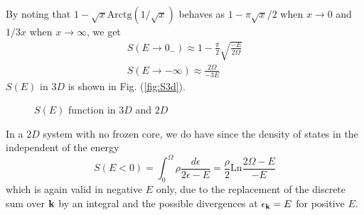 \documentclass[11pt]{article} %
\begin{document}
By noting that $1-\sqrt{x}\text{Arctg}(1/\sqrt{x})$ behaves as $1-\pi\sqrt{x}/2$ when $x\to0$ and $1/3x$ when $x\to\infty$, we get 
\begin{gather}
S(E\to0_{-})\approx1-\frac{\pi}{2}\sqrt{\frac{-E}{2\Omega}}\\
S(E\to-\infty)\approx\frac{2\Omega}{-3E}
\end{gather}
$S(E)$ in $3D$ is shown in Fig. (\ref{fig:S3d}).
\begin{figure}[hhtb]
	\centering
	         \qquad
		\caption{$S(E)$ function in $3D$ and $2D$\label{fig:narrowFR}}
\end{figure}
In a $2D$ system with no frozen core, we do have since the density of states in the independent of the energy
\begin{equation}
S(E<0)=\int_{0}^{\Omega}\rho\frac{d\epsilon}{2\epsilon-E}=\frac{\rho}{2}\text{Ln}\frac{2\Omega-E}{-E}
\end{equation}
which is again valid in negative $E$ only, due to the replacement of the discrete sum over $\mathbf{k}$ by an integral and the possible divergences at $\epsilon_{\mathbf{k}}=E$ for positive $E$. 
\end{document}
